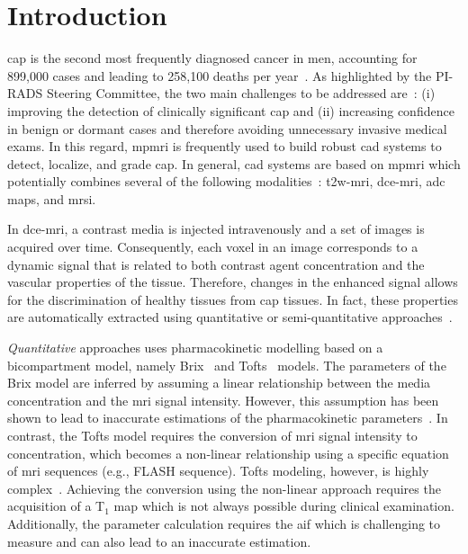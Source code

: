 \section{Introduction}

\Ac{cap} is the second most frequently diagnosed cancer in men,
accounting for 899,000 cases and leading to 258,100 deaths per year~\citep{ferlay2010estimates}.
As highlighted by the PI-RADS Steering Committee, the two main challenges to be addressed are~\citep{weinreb2016pi}:
(i) improving the detection of clinically significant \ac{cap} and
(ii) increasing confidence in benign or dormant cases and therefore avoiding unnecessary invasive medical exams.
In this regard, \ac{mpmri} is frequently used to build robust \ac{cad} systems to detect, localize, and grade \ac{cap}.
In general, \ac{cad} systems are based on \ac{mpmri} which potentially combines several of the following modalities~\citep{lemaitre2015computer}: \ac{t2w}-\ac{mri}, \ac{dce}-\ac{mri}, \ac{adc} maps, and \ac{mrsi}.

In \ac{dce}-\ac{mri}, a contrast media is injected intravenously and a set of images is acquired over time.
Consequently, each voxel in an image corresponds to a dynamic signal that is related to both contrast agent concentration and the vascular properties of the tissue.
Therefore, changes in the enhanced signal allows for the
discrimination of healthy tissues from \ac{cap} tissues.
In fact, these properties are automatically extracted using quantitative or semi-quantitative approaches~\citep{lemaitre2015computer}.

\emph{Quantitative} approaches uses pharmacokinetic modelling based on a bicompartment model, namely Brix~\citep{brix1991pharmacokinetic} and Tofts~\citep{tofts1995quantitative} models.
The parameters of the Brix model are inferred by assuming a linear relationship between the media concentration and the \ac{mri} signal intensity.
However, this assumption has been shown to lead to inaccurate
estimations of the pharmacokinetic parameters~\citep{heilmann2006determination}.
In contrast, the Tofts model requires the conversion of \ac{mri}
signal intensity to concentration, which becomes a non-linear
relationship using a specific equation of \ac{mri} sequences (e.g., FLASH sequence).
Tofts modeling, however, is highly complex~\citep{gliozzi2011phenomenological}.
Achieving the conversion using the non-linear approach requires the
acquisition of a T$_1$ map which is not always possible during clinical examination.
Additionally, the parameter calculation requires the \ac{aif} which is challenging to measure and can also lead to an inaccurate estimation.

